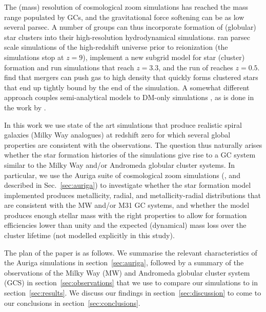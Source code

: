 \documentclass[a4paper,fleqn,usenatbib]{mnras}
\begin{document}
The (mass) resolution of cosmological zoom simulations has reached the mass range 
populated by GCs, and the gravitational force softening can be as low several 
parsec. A number of groups can thus incorporate formation of (globular) star 
clusters into their high-resolution hydrodynamical simulations. \citet{2016ApJ...831..204R} 
ran parsec scale simulations of the high-redshift universe 
prior to reionization (the simulations stop at $z=9$), \citet{2017ApJ...834...69L} 
implement a new subgrid model for star (cluster) formation and run simulations 
that reach $z=3.3$, and the run of \citet{2017MNRAS.465.3622R} reaches $z=0.5$. 
\citet{2018MNRAS.474.4232K} find that mergers can push gas to high density that
quickly forms clustered stars that end up tightly bound by the end of the 
simulation. A somewhat different approach couples semi-analytical models to DM-only
simulations \citep{2010ApJ...718.1266M,2014ApJ...796...10L,2018MNRAS.480.2343C,
2019MNRAS.486..331C,2019arXiv190505199C}, as is done in the work by 
\citet{2019MNRAS.482.4528E}.

In this work we use state of the art simulations that produce realistic spiral 
galaxies (Milky Way analogues) at redshift zero for which several global properties 
are consistent with the observations. The question thus naturally arises whether 
the star formation histories of the simulations give rise to a GC system 
similar to the Milky Way and/or Andromeda globular cluster systems. In particular, 
we use the Auriga suite of cosmological zoom simulations 
(\citealt{2017MNRAS.467..179G}, and described in Sec.~\ref{sec:auriga}) to
investigate whether the star formation model implemented produces metallicity, 
radial, and metallicity-radial distributions that are consistent with the MW 
and/or M31 GC systems, and whether the model produces enough stellar mass with
the right properties to allow for formation efficiencies lower than unity and
the expected (dynamical) mass loss over the cluster lifetime (not modelled 
explicitly in this study). 

The plan of the paper is as follows. We summarise the relevant characteristics 
of the Auriga simulations in section~\ref{sec:auriga}, followed by a summary of 
the observations of the Milky Way (MW) and Andromeda globular cluster system (GCS)
in section~\ref{sec:observations} that we use to compare our simulations to in
section~\ref{sec:results}. We discuss our findings in section~\ref{sec:discussion}
to come to our conclusions in section~\ref{sec:conclusions}.
\end{document}
